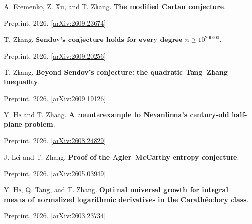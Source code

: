 \documentclass[11pt,letterpaper]{article}
\begin{document}
\begin{enumerate}[label={[\arabic*]},series=preprints]
\item \begin{minipage}[t]{\linewidth}\raggedright A. Eremenko, Z. Xu, and T. Zhang. \textbf{The modified Cartan conjecture}.\par Preprint, 2026. [\href{https://arxiv.org/abs/2609.23674}{arXiv:2609.23674}]\end{minipage}

\item \begin{minipage}[t]{\linewidth}\raggedright T. Zhang. \textbf{Sendov's conjecture holds for every degree \(n\geq 10^{200000}\)}.\par Preprint, 2026. [\href{https://arxiv.org/abs/2609.20256}{arXiv:2609.20256}]\end{minipage}

\item \begin{minipage}[t]{\linewidth}\raggedright T. Zhang. \textbf{Beyond Sendov's conjecture: the quadratic Tang--Zhang inequality}.\par Preprint, 2026. [\href{https://arxiv.org/abs/2609.19126}{arXiv:2609.19126}]\end{minipage}

\item \begin{minipage}[t]{\linewidth}\raggedright Y. He and T. Zhang. \textbf{A counterexample to Nevanlinna's century-old half-plane problem}.\par Preprint, 2026. [\href{https://arxiv.org/abs/2608.24829}{arXiv:2608.24829}]\end{minipage}

\item \begin{minipage}[t]{\linewidth}\raggedright J. Lei and T. Zhang. \textbf{Proof of the Agler--McCarthy entropy conjecture}.\par Preprint, 2026. [\href{https://arxiv.org/abs/2605.03949}{arXiv:2605.03949}]\end{minipage}

\item \begin{minipage}[t]{\linewidth}\raggedright Y. He, Q. Tang, and T. Zhang. \textbf{Optimal universal growth for integral means of normalized logarithmic derivatives in the Carathéodory class}.\par Preprint, 2026. [\href{https://arxiv.org/abs/2603.23734}{arXiv:2603.23734}]\end{minipage}


\end{enumerate}
\end{document}
